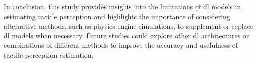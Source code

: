 
In conclusion, this study provides insights into the limitations of \gls{dl} models in estimating tactile perception and highlights the importance of considering alternative methods, such as physics engine simulations, to supplement or replace \gls{dl} models when necessary. Future studies could explore other \gls{dl} architectures or combinations of different methods to improve the accuracy and usefulness of tactile perception estimation.




